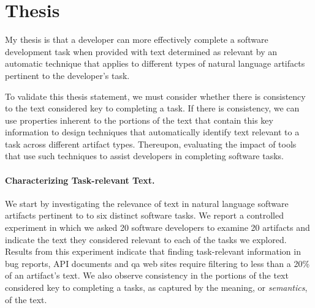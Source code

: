 

\section{Thesis}
\label{cp1:thesis}


My thesis is that a developer can more effectively complete a software development task when  provided
with text  determined as relevant 
by an automatic technique that applies to 
different types of natural language artifacts pertinent to the developer's task.








To validate this thesis statement, 
we must consider whether there is consistency to 
the text considered key to completing a task.
If there is consistency, we can use properties inherent 
to the portions of the text that contain this key information 
to design techniques that automatically identify text relevant to a task across
different artifact types.
Thereupon, evaluating the impact of tools that use such techniques to assist developers in completing software tasks. 



\paragraph{\textbf{Characterizing Task-relevant Text.}} 


We start by investigating the relevance of text in natural language software artifacts
pertinent to to six distinct software tasks.
We report a controlled experiment in which we asked 20 software developers to examine 20 artifacts
and indicate  the text they considered relevant to each of the tasks we explored.
Results from this experiment indicate that 
finding task-relevant information in bug
reports, API documents and \acf{qa} web sites require filtering
to less than a 20\% of an artifact's text.
We also observe consistency in 
the portions of the text 
considered key to completing a tasks, as captured by the meaning, or \textit{semantics}, of the
 text.


